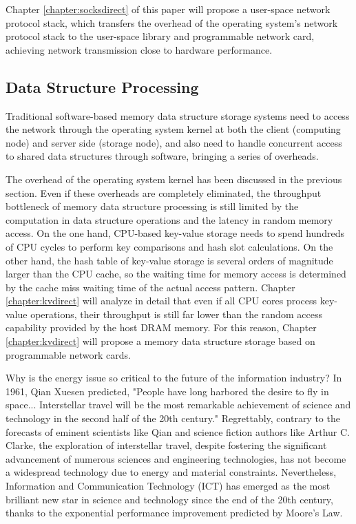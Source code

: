 Chapter \ref{chapter:socksdirect} of this paper will propose a user-space network protocol stack, which transfers the overhead of the operating system's network protocol stack to the user-space library and programmable network card, achieving network transmission close to hardware performance.

\subsection{Data Structure Processing}

Traditional software-based memory data structure storage systems need to access the network through the operating system kernel at both the client (computing node) and server side (storage node), and also need to handle concurrent access to shared data structures through software, bringing a series of overheads.

The overhead of the operating system kernel has been discussed in the previous section. Even if these overheads are completely eliminated, the throughput bottleneck of memory data structure processing is still limited by the computation in data structure operations and the latency in random memory access. On the one hand, CPU-based key-value storage needs to spend hundreds of CPU cycles to perform key comparisons and hash slot calculations. On the other hand, the hash table of key-value storage is several orders of magnitude larger than the CPU cache, so the waiting time for memory access is determined by the cache miss waiting time of the actual access pattern. Chapter \ref{chapter:kvdirect} will analyze in detail that even if all CPU cores process key-value operations, their throughput is still far lower than the random access capability provided by the host DRAM memory. For this reason, Chapter \ref{chapter:kvdirect} will propose a memory data structure storage based on programmable network cards.

\iffalse
Why is the energy issue so critical to the future of the information industry?
In 1961, Qian Xuesen predicted, "People have long harbored the desire to fly in space... Interstellar travel will be the most remarkable achievement of science and technology in the second half of the 20th century." \cite{qianxuesen}
Regrettably, contrary to the forecasts of eminent scientists like Qian and science fiction authors like Arthur C. Clarke, the exploration of interstellar travel, despite fostering the significant advancement of numerous sciences and engineering technologies, has not become a widespread technology due to energy and material constraints.
Nevertheless, Information and Communication Technology (ICT) has emerged as the most brilliant new star in science and technology since the end of the 20th century, thanks to the exponential performance improvement predicted by Moore's Law.

